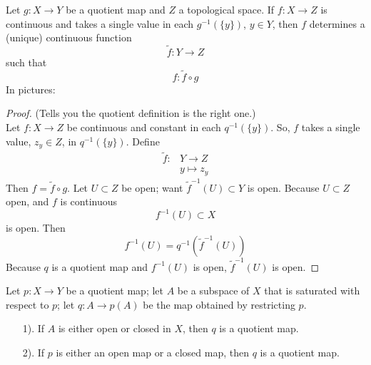 \begin{customthm}{4.9}
Let $g: X \longrightarrow Y$ be a quotient map and $Z$ a topological space. If $f: X \longrightarrow Z$ is continuous and takes a single value in each $g^{-1}\left(\{y\}\right)$, $y \in Y$, then $f$ determines a (unique) continuous function
$$\widetilde{f}: Y \longrightarrow Z$$
such that 
$$f: \widetilde{f} \circ g$$
In pictures:
    \begin{center}
    \end{center}
\end{customthm}

\begin{proof}(Tells you the quotient definition is the right one.)\\
Let $f: X \longrightarrow Z$ be continuous and constant in each $q^{-1}\left(\{y\}\right)$. So, $f$ takes a single value, $z_y \in Z$, in $q^{-1}\left(\{y\}\right)$. Define
\begin{align*}
    \widetilde{f}: &Y \longrightarrow Z\\
    & y \longmapsto z_y
\end{align*}
Then $f = \widetilde{f} \circ g$. Let $U \subset Z$ be open; want $\widetilde{f}^{-1}(U) \subset Y$ is open. Because $U \subset Z$ open, and $f$ is continuous
$$f^{-1}(U) \subset X$$
is open. Then
$$f^{-1}(U) = q^{-1} \left(\widetilde{f}^{-1}(U)\right)$$
Because $q$ is a quotient map and $f^{-1}(U)$ is open, $\widetilde{f}^{-1}(U)$ is open.
\end{proof}

\begin{customthm}{4.10}
Let $p: X \longrightarrow Y$ be a quotient map; let $A$ be a subspace of $X$ that is saturated with respect to $p$; let $q : A \longrightarrow p(A)$ be the map obtained by restricting $p$.
\begin{enumerate}
    \item[1).] If $A$ is either open or closed in $X$, then $q$ is a quotient map.
    \item[2).] If $p$ is either an open map or a closed map, then $q$ is a quotient map.
\end{enumerate}
\end{customthm}